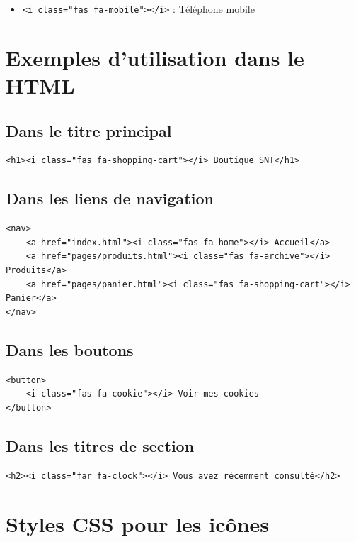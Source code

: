\documentclass[12pt,a4paper]{article}
\begin{document}
\begin{itemize}
\item \faMobile{} \texttt{<i class="fas fa-mobile"></i>} : Téléphone mobile
\end{itemize}

\section{Exemples d'utilisation dans le HTML}

\subsection{Dans le titre principal}

\begin{lstlisting}
<h1><i class="fas fa-shopping-cart"></i> Boutique SNT</h1>
\end{lstlisting}

\subsection{Dans les liens de navigation}

\begin{lstlisting}
<nav>
    <a href="index.html"><i class="fas fa-home"></i> Accueil</a>
    <a href="pages/produits.html"><i class="fas fa-archive"></i> Produits</a>
    <a href="pages/panier.html"><i class="fas fa-shopping-cart"></i> Panier</a>
</nav>
\end{lstlisting}

\subsection{Dans les boutons}

\begin{lstlisting}
<button>
    <i class="fas fa-cookie"></i> Voir mes cookies
</button>
\end{lstlisting}

\subsection{Dans les titres de section}

\begin{lstlisting}
<h2><i class="far fa-clock"></i> Vous avez récemment consulté</h2>
\end{lstlisting}

\section{Styles CSS pour les icônes}
\end{document}
